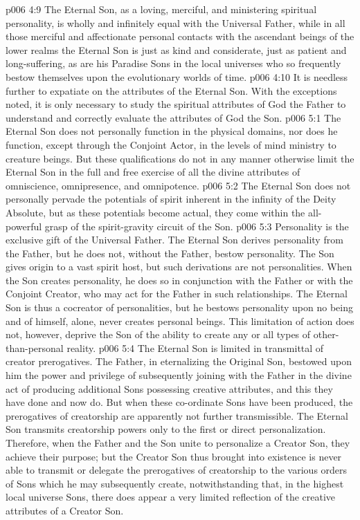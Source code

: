 \pc \vs p006 4:9 The Eternal Son, as a loving, merciful, and ministering spiritual personality, is wholly and infinitely equal with the Universal Father, while in all those merciful and affectionate personal contacts with the ascendant beings of the lower realms the Eternal Son is just as kind and considerate, just as patient and long\hyp{}suffering, as are his Paradise Sons in the local universes who so frequently bestow themselves upon the evolutionary worlds of time.
\vs p006 4:10 It is needless further to expatiate on the attributes of the Eternal Son. With the exceptions noted, it is only necessary to study the spiritual attributes of God the Father to understand and correctly evaluate the attributes of God the Son.
\vs p006 5:1 The Eternal Son does not personally function in the physical domains, nor does he function, except through the Conjoint Actor, in the levels of mind ministry to creature beings. But these qualifications do not in any manner otherwise limit the Eternal Son in the full and free exercise of all the divine attributes of  omniscience, omnipresence, and omnipotence.
\vs p006 5:2 The Eternal Son does not personally pervade the potentials of spirit inherent in the infinity of the Deity Absolute, but as these potentials become actual, they come within the all\hyp{}powerful grasp of the spirit\hyp{}gravity circuit of the Son.
\vs p006 5:3 Personality is the exclusive gift of the Universal Father. The Eternal Son derives personality from the Father, but he does not, without the Father, bestow personality. The Son gives origin to a vast spirit host, but such derivations are not personalities. When the Son creates personality, he does so in conjunction with the Father or with the Conjoint Creator, who may act for the Father in such relationships. The Eternal Son is thus a cocreator of personalities, but he bestows personality upon no being and of himself, alone, never creates personal beings. This limitation of action does not, however, deprive the Son of the ability to create any or all types of other\hyp{}than\hyp{}personal reality.
\vs p006 5:4 The Eternal Son is limited in transmittal of creator prerogatives. The Father, in eternalizing the Original Son, bestowed upon him the power and privilege of subsequently joining with the Father in the divine act of producing additional Sons possessing creative attributes, and this they have done and now do. But when these co\hyp{}ordinate Sons have been produced, the prerogatives of creatorship are apparently not further transmissible. The Eternal Son transmits creatorship powers only to the first or direct personalization. Therefore, when the Father and the Son unite to personalize a Creator Son, they achieve their purpose; but the Creator Son thus brought into existence is never able to transmit or delegate the prerogatives of creatorship to the various orders of Sons which he may subsequently create, notwithstanding that, in the highest local universe Sons, there does appear a very limited reflection of the creative attributes of a Creator Son.\plusone

